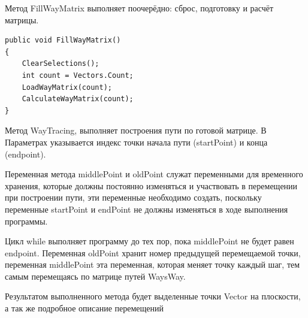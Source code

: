 \documentclass[a4paper,14pt, Times New Roman]{extarticle}
\begin{document}
Метод FillWayMatrix выполняет поочерёдно: сброс, подготовку и расчёт матрицы.

\begin{lstlisting}
public void FillWayMatrix()
{
    ClearSelections();
    int count = Vectors.Count;
    LoadWayMatrix(count);
    CalculateWayMatrix(count);
}
\end{lstlisting}

Метод WayTracing, выполняет построения пути по готовой матрице. В Параметрах указывается индекс точки начала пути (startPoint) и конца (endpoint).

Переменная метода middlePoint и oldPoint служат переменными для временного хранения, которые должны постоянно изменяться и участвовать в перемещении при построении пути, эти переменные необходимо создать, поскольку переменные startPoint и endPoint не должны изменяться в ходе выполнения программы.

Цикл while выполняет программу до тех пор, пока middlePoint не будет равен endpoint. Переменная oldPoint хранит номер предыдущей перемещаемой точки, переменная middlePoint эта переменная, которая меняет точку каждый шаг, тем самым перемещаясь по матрице путей WaysWay.

Результатом выполненного метода будет выделенные точки Vector на плоскости, а так же подробное описание перемещений
\end{document}

